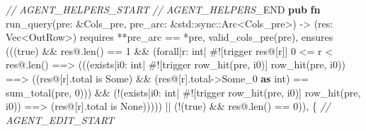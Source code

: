 \documentclass[
  10pt,
]{article}
\newenvironment{Shaded}{}{}
\newcommand{\AttributeTok}[1]{\textcolor[rgb]{0.49,0.56,0.16}{#1}}
\newcommand{\CommentTok}[1]{\textcolor[rgb]{0.38,0.63,0.69}{\textit{#1}}}
\newcommand{\ConstantTok}[1]{\textcolor[rgb]{0.53,0.00,0.00}{#1}}
\newcommand{\DataTypeTok}[1]{\textcolor[rgb]{0.56,0.13,0.00}{#1}}
\newcommand{\DecValTok}[1]{\textcolor[rgb]{0.25,0.63,0.44}{#1}}
\newcommand{\KeywordTok}[1]{\textcolor[rgb]{0.00,0.44,0.13}{\textbf{#1}}}
\newcommand{\NormalTok}[1]{#1}
\newcommand{\OperatorTok}[1]{\textcolor[rgb]{0.40,0.40,0.40}{#1}}
\newcommand{\PreprocessorTok}[1]{\textcolor[rgb]{0.74,0.48,0.00}{#1}}
\newcommand{\RegionMarkerTok}[1]{#1}
\begin{document}
\begin{Shaded}
\begin{Highlighting}[]
\CommentTok{// AGENT\_HELPERS\_START}
\CommentTok{// AGENT\_HELPERS\_}\RegionMarkerTok{END}
\KeywordTok{pub} \KeywordTok{fn}\NormalTok{ run\_query(pre}\OperatorTok{:} \OperatorTok{\&}\NormalTok{Cols\_pre}\OperatorTok{,}\NormalTok{ pre\_arc}\OperatorTok{:} \OperatorTok{\&}\PreprocessorTok{std::sync::}\NormalTok{Arc}\OperatorTok{\textless{}}\NormalTok{Cols\_pre}\OperatorTok{\textgreater{}}\NormalTok{) }\OperatorTok{{-}\textgreater{}}\NormalTok{ (res}\OperatorTok{:} \DataTypeTok{Vec}\OperatorTok{\textless{}}\NormalTok{OutRow}\OperatorTok{\textgreater{}}\NormalTok{)}
\NormalTok{    requires}
        \OperatorTok{**}\NormalTok{pre\_arc }\OperatorTok{==} \OperatorTok{*}\NormalTok{pre}\OperatorTok{,}
\NormalTok{        valid\_cols\_pre(pre)}\OperatorTok{,}
\NormalTok{    ensures}
\NormalTok{        (((}\ConstantTok{true}\NormalTok{) }\OperatorTok{\&\&}\NormalTok{ res}\OperatorTok{@.}\NormalTok{len() }\OperatorTok{==} \DecValTok{1} \OperatorTok{\&\&}\NormalTok{ (forall}\OperatorTok{|}\NormalTok{r}\OperatorTok{:}\NormalTok{ int}\OperatorTok{|} \AttributeTok{\#![}\NormalTok{trigger res}\OperatorTok{@}\NormalTok{[r}\AttributeTok{]}\NormalTok{] }\DecValTok{0} \OperatorTok{\textless{}=}\NormalTok{ r }\OperatorTok{\textless{}}\NormalTok{ res}\OperatorTok{@.}\NormalTok{len() }\OperatorTok{==\textgreater{}}\NormalTok{ (((exists}\OperatorTok{|}\NormalTok{i0}\OperatorTok{:}\NormalTok{ int}\OperatorTok{|} \AttributeTok{\#![}\NormalTok{trigger row\_hit}\AttributeTok{(}\NormalTok{pre}\OperatorTok{,}\NormalTok{ i0}\AttributeTok{)]}\NormalTok{ row\_hit(pre}\OperatorTok{,}\NormalTok{ i0)) }\OperatorTok{==\textgreater{}}\NormalTok{ ((res}\OperatorTok{@}\NormalTok{[r]}\OperatorTok{.}\NormalTok{total is }\ConstantTok{Some}\NormalTok{) }\OperatorTok{\&\&}\NormalTok{ (res}\OperatorTok{@}\NormalTok{[r]}\OperatorTok{.}\NormalTok{total}\OperatorTok{{-}\textgreater{}}\NormalTok{Some\_0 }\KeywordTok{as}\NormalTok{ int) }\OperatorTok{==}\NormalTok{ sum\_total(pre}\OperatorTok{,} \DecValTok{0}\NormalTok{))) }\OperatorTok{\&\&}\NormalTok{ (}\OperatorTok{!}\NormalTok{(exists}\OperatorTok{|}\NormalTok{i0}\OperatorTok{:}\NormalTok{ int}\OperatorTok{|} \AttributeTok{\#![}\NormalTok{trigger row\_hit}\AttributeTok{(}\NormalTok{pre}\OperatorTok{,}\NormalTok{ i0}\AttributeTok{)]}\NormalTok{ row\_hit(pre}\OperatorTok{,}\NormalTok{ i0)) }\OperatorTok{==\textgreater{}}\NormalTok{ (res}\OperatorTok{@}\NormalTok{[r]}\OperatorTok{.}\NormalTok{total is }\ConstantTok{None}\NormalTok{))))) }\OperatorTok{||}\NormalTok{ (}\OperatorTok{!}\NormalTok{(}\ConstantTok{true}\NormalTok{) }\OperatorTok{\&\&}\NormalTok{ res}\OperatorTok{@.}\NormalTok{len() }\OperatorTok{==} \DecValTok{0}\NormalTok{))}\OperatorTok{,}
\OperatorTok{\{}
\CommentTok{// AGENT\_EDIT\_START}
\end{Highlighting}
\end{Shaded}
\end{document}

